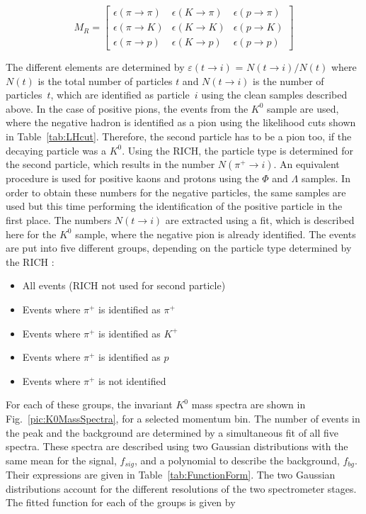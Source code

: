 \begin{equation}
  M_R
  =
  \begin{bmatrix}
  \epsilon(\pi \rightarrow \pi) & \epsilon(K \rightarrow \pi) & \epsilon(p \rightarrow \pi)\\
  \epsilon(\pi \rightarrow K) & \epsilon(K \rightarrow K) & \epsilon(p \rightarrow K) \\
  \epsilon(\pi \rightarrow p) & \epsilon(K \rightarrow p) & \epsilon(p \rightarrow p)
  \end{bmatrix}
\end{equation}

The different elements are determined by $\varepsilon(t \rightarrow i)$ = $N(t \rightarrow i)/N(t)$ where $N(t)$ is the total number of particles $t$ and $N(t \rightarrow i)$ is the number of particles~$t$, which are identified as particle~$i$ using the clean samples described above. In the case of positive pions, the events from the $K^0$ sample are used, where the negative hadron is identified as a pion using the likelihood cuts shown in Table~\ref{tab:LHcut}.  Therefore, the second particle has to be a pion too, if the decaying particle was a $K^0$. Using the RICH, the particle type is determined for the second particle, which  results in the number $N(\pi^+ \rightarrow i)$. An equivalent procedure is used for positive kaons and protons using the $\Phi$ and $\Lambda$ samples. In order to obtain these numbers for the negative particles, the same samples are used but this time performing the identification of the positive particle in the first place. The numbers $N(t \rightarrow i)$ are extracted using a fit, which is described here for the $K^0$ sample, where the negative pion is already identified. The events are put into five different groups, depending on the particle type determined by the RICH :

\begin{itemize}
  \item All events (RICH not used for second particle)
  \item Events where $\pi^+$ is identified as $\pi^+$
  \item Events where $\pi^+$ is identified as $K^+$
  \item Events where $\pi^+$ is identified as $p$
  \item Events where $\pi^+$ is not identified
\end{itemize}

For each of these groups, the invariant $K^0$ mass spectra are shown in Fig.~\ref{pic:K0MassSpectra}, for a selected momentum bin. The number of events in the peak and the background are determined by a simultaneous fit of all five spectra. These spectra are described using two Gaussian distributions with the same mean for the signal, $f_{sig}$, and a polynomial to describe the background, $f_{bg}$. Their expressions are given in Table~\ref{tab:FunctionForm}. The two Gaussian distributions account for the different resolutions of the two spectrometer stages. The fitted function for each of the groups is given by

